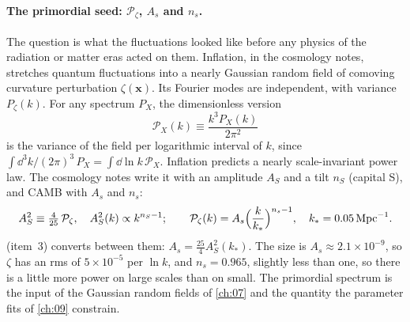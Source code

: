 \paragraph{The primordial seed: $\mathcal P_\zeta$, $A_s$ and $n_s$.}
The question is what the fluctuations looked like before any physics of the radiation or matter eras acted on them. Inflation, in the cosmology notes, stretches quantum fluctuations into a nearly Gaussian random field of comoving curvature perturbation $\zeta(\bm x)$. Its Fourier modes are independent, with variance $P_\zeta(k)$. For any spectrum $P_X$, the dimensionless version
\begin{equation*}
\mathcal P_X(k)\equiv\frac{k^3P_X(k)}{2\pi^2}
\end{equation*}
is the variance of the field per logarithmic interval of $k$, since $\int\!\dd^3k/(2\pi)^3\,P_X=\int\!\dd\ln k\,\mathcal P_X$. Inflation predicts a nearly scale-invariant power law. The cosmology notes write it with an amplitude $A_S$ and a tilt $n_S$ (capital S), and CAMB with $A_s$ and $n_s$:
\begin{equation*}
A_S^2\equiv\tfrac{4}{25}\,\mathcal P_\zeta,\quad A_S^2(k)\propto k^{n_S-1};
\qquad
\mathcal P_\zeta(k)=A_s\Bigl(\frac{k}{k_*}\Bigr)^{n_s-1},\quad k_*=0.05\,\mathrm{Mpc}^{-1}.
\end{equation*}
 (item~3) converts between them: $A_s=\tfrac{25}{4}A_S^2(k_*)$. The size is $A_s\approx2.1\times10^{-9}$, so $\zeta$ has an rms of $5\times10^{-5}$ per $\ln k$, and $n_s=0.965$, slightly less than one, so there is a little more power on large scales than on small. The primordial spectrum is the input of the Gaussian random fields of \cref{ch:07} and the quantity the parameter fits of \cref{ch:09} constrain.

